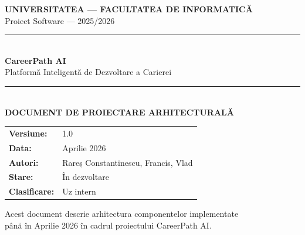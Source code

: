 \documentclass[12pt, a4paper]{report}
\begin{document}

\begin{titlepage}

\vspace*{1.8cm}
\begin{center}
  {\color{white}\Large\bfseries UNIVERSITATEA — FACULTATEA DE INFORMATICĂ}\\[0.3cm]
  {\color{white!80!gray}\normalsize Proiect Software — 2025/2026}
\end{center}

\vspace{3cm}

\begin{center}
  {\color{primary}\rule{14cm}{1.5pt}}\\[0.8cm]
  {\Huge\bfseries\color{darkgray} CareerPath AI}\\[0.4cm]
  {\Large\color{accent} Platformă Inteligentă de Dezvoltare a Carierei}\\[0.6cm]
  {\color{primary}\rule{14cm}{1.5pt}}\\[0.8cm]
  {\LARGE\bfseries\color{darkgray} DOCUMENT DE PROIECTARE ARHITECTURALĂ}
\end{center}

\vspace{2.5cm}

\begin{center}
\begin{tabular}{ll}
  \textbf{Versiune:}   & 1.0 \\[4pt]
  \textbf{Data:}       & Aprilie 2026 \\[4pt]
  \textbf{Autori:}     & Rareș Constantinescu, Francis, Vlad \\[4pt]
  \textbf{Stare:}      & În dezvoltare \\[4pt]
  \textbf{Clasificare:}& Uz intern \\
\end{tabular}
\end{center}

\vfill
\begin{center}
  {\small\color{muted} Acest document descrie arhitectura componentelor implementate\\
  până în Aprilie 2026 în cadrul proiectului CareerPath AI.}
\end{center}
\end{titlepage}
\end{document}
